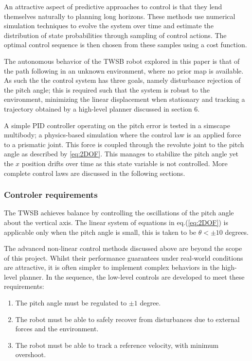         An attractive aspect of predictive approaches to control is that they lend themselves naturally to 
        planning long horizons. These methods use numerical simulation techniques to evolve the system over time 
        and estimate the distribution of state probabilities through sampling of control actions. 
        The optimal control sequence is then chosen from these samples using a cost function.
                    
        The autonomous behavior of the TWSB robot explored in this paper is that of the path 
        following in an unknown environment, where no prior map is available. As such the 
        the control system has three goals, namely disturbance rejection of the pitch angle; 
        this is required such that the system is robust to the environment, minimizing 
        the linear displacement when stationary and tracking a trajectory obtained by a 
        high-level planner discussed in section 6. 
    
        A simple PID controller operating on the pitch error is tested in a simscape multibody; 
        a physics-based simulation where the control law is an applied force to a prismatic joint. 
        This force is coupled through the revolute joint to the pitch angle as described by \ref{eq:2DOF}.
        This manages to stabilize the pitch angle yet the $x$ position drifts over time as this 
        state variable is not controlled.
        More complete control laws are discussed in the following sections.
        \subsubsection{Controler requirements}

        The TWSB achieves balance by controlling the oscillations of the pitch angle about the 
        vertical axis. The linear system of equations in eq.(\ref{eq:2DOF}) is applicable 
        only when the pitch angle is small, this is taken to be $\theta < ±10$ degrees. 

        The advanced non-linear control methods discussed above are beyond the scope of this project. 
        Whilst their performance guarantees under real-world conditions are attractive, it is often simpler 
        to implement complex behaviors in the high-level planner.
        In the sequence, the low-level controls are developed to meet these requirements:
        \begin{enumerate}
            \item The pitch angle must be regulated to $±1$ degree.
            \item The robot must be able to safely recover from disturbances due to external forces and the environment.
            \item The robot must be able to track a reference velocity, with minimum overshoot.
        \end{enumerate}

